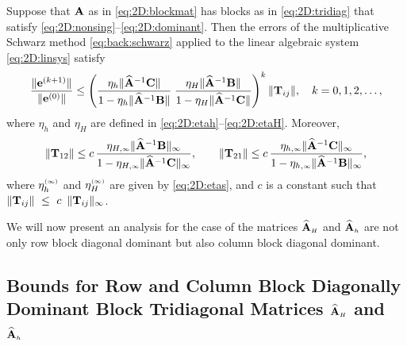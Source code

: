 \begin{thm}\label{thm:2D:main}
Suppose that $\mathbf{A}$ as in \eqref{eq:2D:blockmat} has blocks as in
\eqref{eq:2D:tridiag} that satisfy
\eqref{eq:2D:nonsing}--\eqref{eq:2D:dominant}.
Then the errors of the  multiplicative Schwarz method \eqref{eq:back:schwarz}
applied to the linear algebraic system \eqref{eq:2D:linsys} satisfy
%
$$\frac{\|\mathbf{e}^{(k+1)}\|}{\|\mathbf{e}^{(0)}\|} \leq
\left(\frac{\eta_h \|\widehat{\mathbf{A}}^{-1}\mathbf{C}\|}{1-\eta_h \|\widehat{\mathbf{A}}^{-1}\mathbf{B}\|}\;
\frac{\eta_H\|\widehat{\mathbf{A}}^{-1}\mathbf{B}\|}
{1-\eta_H\|\widehat{\mathbf{A}}^{-1}\mathbf{C}\|}\right)^k\|\mathbf{T}_{ij}\|,
\quad k=0,1,2,\dots,$$
%
where $\eta_h$ and $\eta_H$ are defined in
\eqref{eq:2D:etah}--\eqref{eq:2D:etaH}.
Moreover,
$$
	\| \T_{12} \| \leq
	c\, \frac{\eta_{H,\klein{\infty}}\|\matA^{-1}\matB\|_{\infty}}
  {1-\eta_{H,\klein{\infty}} \|\matA^{-1}\matC\|_{\infty}}  ,\qquad
%
	\| \T_{21} \| \leq
	c\, \frac{\eta_{h,\klein{\infty}}\|\matA^{-1}\matC\|_{\infty}}
  {1-\eta_{h,\klein{\infty}} \|\matA^{-1}\matB\|_{\infty}},
$$
where $\eta_h^{\scriptscriptstyle (\infty)}$ and $\eta_H^{\scriptscriptstyle (\infty)}$ are given by
\eqref{eq:2D:etas}, and $c$ is a constant such that $\|\mathbf{T}_{ij}\|~\leq~c\,~\|\mathbf{T}_{ij}\|_\infty$.
%
\end{thm}

We will now present an analysis for the case of the matrices $\widehat{\mathbf{A}}_{\scriptscriptstyle H}$ and
$\widehat{\mathbf{A}}_{\scriptscriptstyle h}$ are not only row block diagonal dominant but also column block
diagonal dominant.

\subsection{Bounds for Row and Column Block Diagonally Dominant Block Tridiagonal Matrices $\widehat{\mathbf{A}}_{\scriptscriptstyle H}$ and $\widehat{\mathbf{A}}_{\scriptscriptstyle h}$}
\label{2D:bounds:rowcol}

